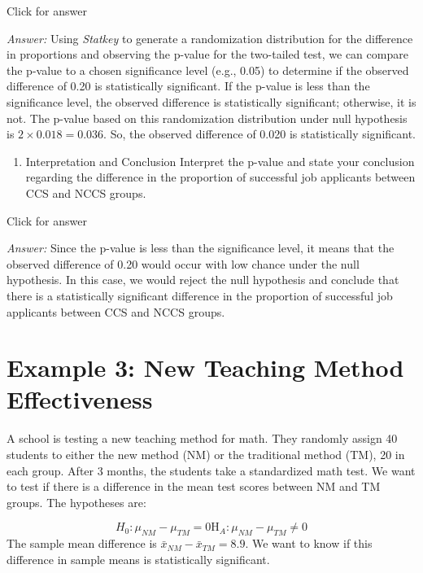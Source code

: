 \documentclass[
]{book}
\providecommand{\tightlist}{%
  \setlength{\itemsep}{0pt}\setlength{\parskip}{0pt}}
\begin{document}
Click for answer

\emph{Answer:} Using \emph{Statkey} to generate a randomization distribution for the difference in proportions and observing the p-value for the two-tailed test, we can compare the p-value to a chosen significance level (e.g., 0.05) to determine if the observed difference of 0.20 is statistically significant. If the p-value is less than the significance level, the observed difference is statistically significant; otherwise, it is not. The p-value based on this randomization distribution under null hypothesis is \(2 \times 0.018 = 0.036\). So, the observed difference of 0.020 is statistically significant.

\begin{enumerate}
\def\labelenumi{(\alph{enumi})}
\setcounter{enumi}{2}
\tightlist
\item
  Interpretation and Conclusion
  Interpret the p-value and state your conclusion regarding the difference in the proportion of successful job applicants between CCS and NCCS groups.
\end{enumerate}

Click for answer

\emph{Answer:} Since the p-value is less than the significance level, it means that the observed difference of 0.20 would occur with low chance under the null hypothesis. In this case, we would reject the null hypothesis and conclude that there is a statistically significant difference in the proportion of successful job applicants between CCS and NCCS groups.

\hypertarget{example-3-new-teaching-method-effectiveness}{%
\section{Example 3: New Teaching Method Effectiveness}\label{example-3-new-teaching-method-effectiveness}}

A school is testing a new teaching method for math. They randomly assign 40 students to either the new method (NM) or the traditional method (TM), 20 in each group. After 3 months, the students take a standardized math test. We want to test if there is a difference in the mean test scores between NM and TM groups. The hypotheses are:

\[H_0: \mu_{N M}-\mu_{T M}=0 \mathrm{H}_A: \mu_{NM} - \mu_{TM} \neq 0\]
The sample mean difference is \(\bar{x}_{NM} - \bar{x}_{TM} = 8.9\). We want to know if this difference in sample means is statistically significant.
\end{document}
